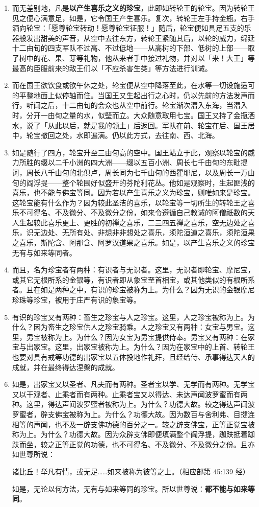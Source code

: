 \begin{enumerate}
\item 而无差别地，凡是\textbf{以产生喜乐之义的珍宝}，此即如转轮王的轮宝。因为转轮王见之便心满意足，如是，它令国王产生喜乐。复次，转轮王左手持金瓶，右手洒向轮宝：「愿尊轮宝转动！愿尊轮宝征服！」随后，轮宝便如具足五支的乐器般发出甜美的声音，从空中去往东方，转轮王紧随其后，以轮的威力，绵延十二由旬的四支军队不过高、不过低地——从高树的下部、低树的上部——取了树中的花、果、芽等礼物，他从来者手中接过礼物，并对以「来！大王」等最高的臣服前来的敌王们以「不应杀害生类」等方法进行训诫。
\item 而在国王欲饮食或欲午休之处，轮宝便从空中降落至此，在水等一切设施适可的平整地面上似停轴而住。当国王又生起出行之心时，仍以先前的方法发声而行，听闻之后，十二由旬的会众也从空中前行。轮宝渐次潜入东海，当潜入时，分开一由旬之量的水，似壁而立。大众随意取用七宝。国王又持了金瓶洒水，说了「从此以后，就是我的领土」后返回。军队在前、轮宝在后、国王居中，轮宝撤回之处，水即遍满。仍以此方式，去往南、西、北海。
\item 如是随行了四方，轮宝升至三由旬高的空中。国王站立于此，观察以轮宝的威力所胜的缀以二千小洲的四大洲——缀以五百小洲、周长七千由旬的东毗提诃，周长八千由旬的北俱卢，周长同为七千由旬的西瞿耶尼，以及周长一万由旬的阎浮提——整个轮围好似盛开的芬陀利花丛。他如是观察时，生起匪浅的喜乐，也不能与佛宝等同。因为若以产生喜乐之义为珍宝，则唯如来是珍宝。这轮宝能有什么作为？因为较此圣洁的喜乐，以轮宝等一切所生的转轮王之喜乐不可得名、不及微分、不及微分之份，如来令遵循自己教诫的阿僧祇数的天人生起较此喜乐更上、更胜的初禅之喜乐，二三四五禅之喜乐，空无边处之喜乐，识无边处、无所有处、非想非非想处之喜乐，须陀洹道之喜乐，须陀洹果之喜乐，斯陀含、阿那含、阿罗汉道果之喜乐。如是，以产生喜乐之义的珍宝无有与如来等同者。
\item 而且，名为珍宝者有两种：有识者与无识者。这里，无识者即轮宝、摩尼宝，或其它无根所系的金银等，有识者即从象宝至首相宝，或其他类似的有根所系者。且在如是两种之中，有识的珍宝被称为上。为什么？因为无识的金银摩尼珍珠等珍宝，被用于庄严有识的象宝等。
\item 有识的珍宝又有两种：畜生之珍宝与人之珍宝。这里，人之珍宝被称为上。为什么？因为畜生之珍宝供人之珍宝骑乘。人之珍宝又有两种：女宝与男宝。这里，男宝被称为上。为什么？因为女宝为男宝提供侍奉。男宝又有两种：在家宝与出家宝。这里，出家宝被称为上。为什么？因为在家宝中的上首、转轮王也要对具有戒等功德的出家宝以五体投地作礼拜，且经给侍、承事得达天人的成就，并在最终得达涅槃的成就。
\item 如是，出家宝又以圣者、凡夫而有两种。圣者宝以学、无学而有两种。无学宝又以干观者、止乘者而有两种。止乘者宝又以得达、未达声闻波罗蜜而有两种。这里，得达声闻波罗蜜者被称为上。为什么？功德大故。较之得达声闻波罗蜜者，辟支佛宝被称为上。为什么？功德大故。因为数百与舍利弗、目揵连相等的声闻，也不及一辟支佛功德的百分之一。较之辟支佛宝，正等正觉宝被称为上。为什么？功德大故。因为众辟支佛即便填满整个阎浮提，跏趺抵着跏趺而坐，较之正等正觉的功德，也不可得名、不及微分、不及微分之份。且亦如世尊所说：\begin{quoting}诸比丘！举凡有情，或无足……如来被称为彼等之上。（相应部第 45:139 经）\end{quoting}如是，无论以何方法，无有与如来等同的珍宝。所以世尊说：\textbf{都不能与如来等同}。

\end{enumerate}
